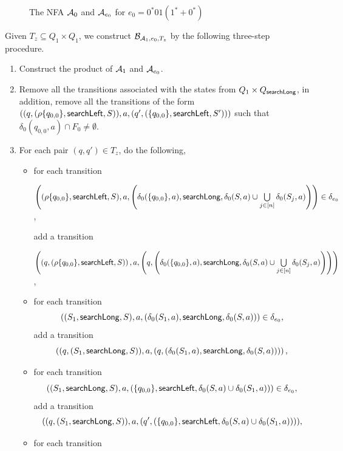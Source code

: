 \begin{example}
\begin{figure}[htbp]
\begin{center}
\end{center}
\caption{The NFA $\mathcal{A}_0$ and $\mathcal{A}_{e_0}$ for $e_0 = 0^*0 1(1^* + 0^*)$}\label{fig-pa-re}
\end{figure} 
\end{example}

Given $T_z \subseteq Q_1 \times Q_1$, we construct $\mathcal{B}_{\mathcal{A}_1, e_0,  T_{z}}$ by  the following three-step procedure.
\begin{enumerate}
\item Construct the product of $\mathcal{A}_1$ and $\mathcal{A}_{e_0}$. 

\item Remove all the transitions associated with the states from $Q_1 \times Q_{\mathsf{searchLong}}$, in addition, remove all the transitions of the form $((q, (\rho\{q_{0,0}\}, \mathsf{searchLeft}, S)), a, (q', (\{q_{0,0}\}, \mathsf{searchLeft},S')))$ such that $\delta_0(q_{0,0},a) \cap F_0 \neq \emptyset$.

\item For each pair $(q,q') \in T_{z}$, do the following,
\begin{itemize}
\item for each transition

\medskip

$\left((\rho \{q_{0,0}\}, \mathsf{searchLeft}, S), a, \left(\delta_0(\{q_{0,0}\}, a), \mathsf{searchLong}, \delta_0(S, a) \cup \bigcup \limits_{j \in [n]} \delta_0(S_j, a) \right) \right) \in \delta_{e_0}$,

\medskip

add a transition

\medskip

$\left( \left(q, (\rho \{q_{0,0}\}, \mathsf{searchLeft}, S) \right), a, \left(q, \left(\delta_0(\{q_{0,0}\}, a), \mathsf{searchLong}, \delta_0(S, a) \cup \bigcup \limits_{j \in [n]} \delta_0(S_j, a) \right) \right) \right)$,

\medskip

%
\item for each transition
		$$((S_1, \mathsf{searchLong}, S), a, (\delta_0(S_1,a), \mathsf{searchLong}, \delta_0(S,a))) \in \delta_{e_0},$$
add a transition 
$$\left((q, (S_1, \mathsf{searchLong}, S)), a, (q, (\delta_0(S_1,a), \mathsf{searchLong}, \delta_0(S,a))) \right),$$
%
\item for each transition
		$$((S_1, \mathsf{searchLong}, S), a, (\{q_{0,0}\}, \mathsf{searchLeft}, \delta_0(S,a) \cup \delta_0(S_1,a))) \in \delta_{e_0},$$
add a transition
		$$((q, (S_1, \mathsf{searchLong}, S)), a, (q', (\{q_{0,0}\}, \mathsf{searchLeft}, \delta_0(S,a) \cup \delta_0(S_1,a)))),$$
%
\item for each transition


\end{itemize}
\end{enumerate}
